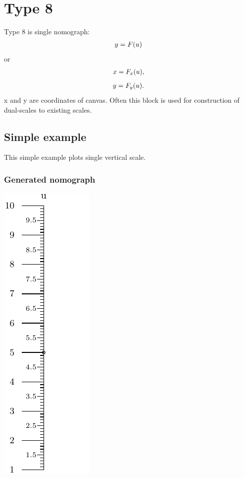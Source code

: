 \documentclass[a4paper,11pt,english]{sphinxmanual}
\begin{document}
\section{Type 8}
\label{types/types:type8-ref}\label{types/types:type-8}
Type 8 is single nomograph:
\begin{gather}
\begin{split}y = F(u)\end{split}\notag
\end{gather}
or
\begin{gather}
\begin{split}x = F_x(u),\end{split}\notag
\end{gather}\begin{gather}
\begin{split}y = F_y(u).\end{split}\notag
\end{gather}
x and y are coordinates of canvas.
Often this block is used for construction of dual-scales to
existing scales.


\subsection{Simple example}
\label{types/types:id37}
This simple example plots single vertical scale.


\subsubsection{Generated nomograph}
\label{types/types:id38}
\includegraphics{ex_type8_nomo_1.pdf}
\end{document}
